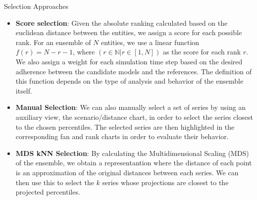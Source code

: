 \documentclass[final]{beamer}
\newlength{\twocolwid}
\begin{document}
\begin{frame}[t]
\begin{columns}[t]
\begin{column}{\twocolwid}
\begin{block}{Selection Approaches}
\begin{itemize}
  \item \textbf{Score selection}: Given the absolute ranking calculated based on the euclidean distance between the entities, we assign a score for each possible rank. For an ensemble of $N$ entities, we use a linear function $f(r) = N - r - 1$, where $\left(r \in \mathbb{N} | r \in [1, N] \right)$ as the score for each rank $r$. We also assign a weight for each simulation time step based on the desired adherence between the candidate models and the references. The definition of this function depends on the type of analysis and behavior of the ensemble itself.
  \item \textbf{Manual Selection}: We can also manually select a set of series by using an auxiliary view, the scenario/distance chart, in order to select the series closest to the chosen percentiles. The selected series are then highlighted in the corresponding fan and rank charts in order to evaluate their behavior.
  \item \textbf{MDS kNN Selection}: By calculating the Multidimensional Scaling (MDS) of the ensemble, we obtain a representantion where the distance of each point is an approximation of the original distances between each series. We can then use this to select the $k$ series whose projections are closest to the projected percentiles.
\end{itemize}
\end{block}


\end{column}
\end{columns}
\end{frame}
\end{document}
